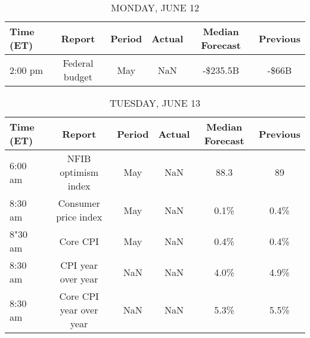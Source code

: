 \documentclass{article}%
\begin{document}
%
\normalsize%


\begin{table}[htbp]%
\caption{MONDAY, JUNE 12}%
\centering%
\begin{adjustbox}{width=1\textwidth}%
\begin{tabular}{lccccc}
\toprule
Time (ET) &         Report & Period & Actual & Median Forecast & Previous \\
\midrule
  2:00 pm & Federal budget &    May &    NaN &        -\$235.5B &    -\$66B \\
\bottomrule
\end{tabular}
%
\end{adjustbox}%
\end{table}

%


\begin{table}[htbp]%
\caption{TUESDAY, JUNE 13}%
\centering%
\begin{adjustbox}{width=1\textwidth}%
\begin{tabular}{lccccc}
\toprule
Time (ET) &                  Report & Period & Actual & Median Forecast & Previous \\
\midrule
  6:00 am &     NFIB optimism index &    May &    NaN &            88.3 &       89 \\
  8:30 am &    Consumer price index &    May &    NaN &            0.1\% &     0.4\% \\
  8"30 am &                Core CPI &    May &    NaN &            0.4\% &     0.4\% \\
  8:30 am &      CPI year over year &    NaN &    NaN &            4.0\% &     4.9\% \\
  8:30 am & Core CPI year over year &    NaN &    NaN &            5.3\% &     5.5\% \\
\bottomrule
\end{tabular}
%
\end{adjustbox}%
\end{table}

%
\end{document}
